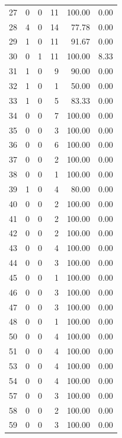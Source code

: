 \documentclass[11pt]{article}
\begin{document}
\begin{longtable}{r|r|r|r|r|r}
    27    & 0     & 0     & 11    & 100.00 & 0.00 \\
    28    & 4     & 0     & 14    & 77.78 & 0.00 \\
    29    & 1     & 0     & 11    & 91.67 & 0.00 \\
    30    & 0     & 1     & 11    & 100.00 & 8.33 \\
    31    & 1     & 0     & 9     & 90.00 & 0.00 \\
    32    & 1     & 0     & 1     & 50.00 & 0.00 \\
    33    & 1     & 0     & 5     & 83.33 & 0.00 \\
    34    & 0     & 0     & 7     & 100.00 & 0.00 \\
    35    & 0     & 0     & 3     & 100.00 & 0.00 \\
    36    & 0     & 0     & 6     & 100.00 & 0.00 \\
    37    & 0     & 0     & 2     & 100.00 & 0.00 \\
    38    & 0     & 0     & 1     & 100.00 & 0.00 \\
    39    & 1     & 0     & 4     & 80.00 & 0.00 \\
    40    & 0     & 0     & 2     & 100.00 & 0.00 \\
    41    & 0     & 0     & 2     & 100.00 & 0.00 \\
    42    & 0     & 0     & 2     & 100.00 & 0.00 \\
    43    & 0     & 0     & 4     & 100.00 & 0.00 \\
    44    & 0     & 0     & 3     & 100.00 & 0.00 \\
    45    & 0     & 0     & 1     & 100.00 & 0.00 \\
    46    & 0     & 0     & 3     & 100.00 & 0.00 \\
    47    & 0     & 0     & 3     & 100.00 & 0.00 \\
    48    & 0     & 0     & 1     & 100.00 & 0.00 \\
    50    & 0     & 0     & 4     & 100.00 & 0.00 \\
    51    & 0     & 0     & 4     & 100.00 & 0.00 \\
    53    & 0     & 0     & 4     & 100.00 & 0.00 \\
    54    & 0     & 0     & 4     & 100.00 & 0.00 \\
    57    & 0     & 0     & 3     & 100.00 & 0.00 \\
    58    & 0     & 0     & 2     & 100.00 & 0.00 \\
    59    & 0     & 0     & 3     & 100.00 & 0.00 \\

\end{longtable}
\end{document}
